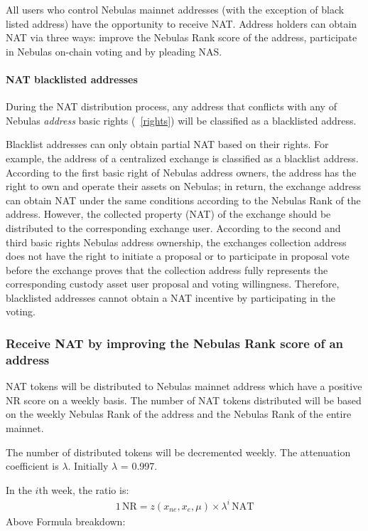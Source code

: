 All users who control Nebulas mainnet addresses (with the exception of black listed address) have the opportunity to receive NAT. Address holders can obtain NAT via three ways: improve the Nebulas Rank score of the address, participate in Nebulas on-chain voting and by pleading NAS.


\paragraph{NAT blacklisted addresses}

During the NAT distribution process, any address that conflicts with any of
Nebulas \emph{address} basic rights (~\ref{rights}) will be classified as a blacklisted address.

Blacklist addresses can only obtain partial NAT based on their rights. For example, the address of a centralized exchange is classified as a blacklist address. According to the first basic right of Nebulas address owners, the address has the right to own and operate their assets on Nebulas; in return, the exchange address can obtain NAT under the same conditions according to the Nebulas Rank of the address. However, the collected property (NAT) of the exchange should be distributed to the corresponding exchange user. According to the second and third basic rights Nebulas address ownership, the exchanges collection address does not have the right to initiate a proposal or to participate in proposal vote before the exchange proves that the collection address fully represents the corresponding custody asset user proposal and voting willingness. Therefore, blacklisted addresses cannot obtain a NAT incentive by participating in the voting.


\subsubsection{Receive NAT by improving the Nebulas Rank score of an address}

NAT tokens will be distributed to Nebulas mainnet address which have a positive NR score on a weekly basis. The number of NAT tokens distributed will be based on the weekly Nebulas Rank of the address and the Nebulas Rank of the entire mainnet.

The number of distributed tokens will be decremented weekly. The attenuation coefficient is $\lambda$. Initially $\lambda$ = 0.997.

In the $i$th week, the ratio is:
\begin{align}
1\,\text{NR}=z(x_{ne},x_{e},\mu)\times\lambda^{i}\,\text{NAT}
\end{align}
Above Formula breakdown:

